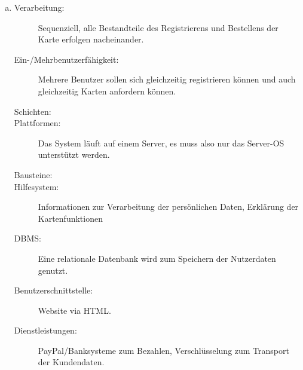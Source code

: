 \begin{enumerate} [a)]
\begin{description}
		\item[Dienstleistungen:] Maps, um Die Pizzeria zu finden.
	\end{description}
	\item 
		\begin{description}
		\item[Verarbeitung:] Sequenziell, alle Bestandteile des Registrierens und Bestellens der Karte erfolgen nacheinander.
		\item[Ein-/Mehrbenutzerfähigkeit:] Mehrere Benutzer sollen sich gleichzeitig registrieren können und auch gleichzeitig Karten anfordern können.
		\item[Schichten:]
		\item[Plattformen:] Das System läuft auf einem Server, es muss also nur das Server-OS unterstützt werden.
		\item[Bausteine:]
		\item[Hilfesystem:] Informationen zur Verarbeitung der persönlichen Daten, Erklärung der Kartenfunktionen
		\item[DBMS:] Eine relationale Datenbank wird zum Speichern der Nutzerdaten genutzt.
		\item[Benutzerschnittstelle:] Website via HTML.
		\item[Dienstleistungen:] PayPal/Banksysteme zum Bezahlen, Verschlüsselung zum Transport der Kundendaten.
	\end{description}
	
\end{enumerate}
